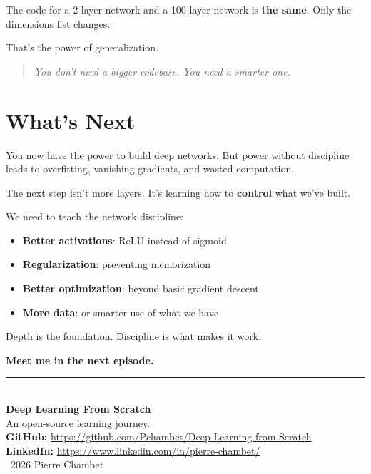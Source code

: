 \documentclass[11pt]{article}
\begin{document}
The code for a 2-layer network and a 100-layer network is \textbf{the same}. Only the dimensions list changes.

That's the power of generalization.

\begin{quote}
\textit{You don't need a bigger codebase. You need a smarter one.}
\end{quote}

\section{What's Next}

You now have the power to build deep networks. But power without discipline leads to overfitting, vanishing gradients, and wasted computation.

The next step isn't more layers. It's learning how to \textbf{control} what we've built.

\begin{actionbox}[title=Next Stop --- Discipline]
We need to teach the network discipline:
\begin{itemize}
  \item \textbf{Better activations}: ReLU instead of sigmoid
  \item \textbf{Regularization}: preventing memorization
  \item \textbf{Better optimization}: beyond basic gradient descent
  \item \textbf{More data}: or smarter use of what we have
\end{itemize}

Depth is the foundation. Discipline is what makes it work.

\textbf{Meet me in the next episode.}
\end{actionbox}

\vspace{2em}
\begin{center}
\rule{0.6\textwidth}{0.4pt}\\[1em]
{\small \textbf{Deep Learning From Scratch}}\\[0.3em]
{\small An open-source learning journey.}\\[0.8em]
{\small \textbf{GitHub:} \url{https://github.com/Pchambet/Deep-Learning-from-Scratch}}\\[0.3em]
{\small \textbf{LinkedIn:} \url{https://www.linkedin.com/in/pierre-chambet/}}\\[1em]
{\footnotesize \textcopyright\ 2026 Pierre Chambet}
\end{center}
\end{document}
